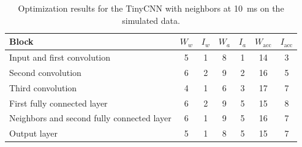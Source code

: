 \begin{table}[H]
    \centering
    \caption{Optimization results for the TinyCNN with neighbors at \SI{10}{\milli\second} on the simulated data.}
    \label{tab:widths}
    \begin{tabular}{@{}lcccccc@{}}
        \toprule
        Block & $W_w$ & $I_w$ & $W_a$ & $I_a$ & $W_{\mathrm{acc}}$ & $I_{\mathrm{acc}}$ \\
        \midrule
        Input and first convolution & 5 & 1 & 8 & 1 & 14 & 3 \\
        Second convolution & 6 & 2 & 9 & 2 & 16 & 5 \\
        Third convolution & 4 & 1 & 6 & 3 & 17 & 7 \\
        First fully connected layer & 6 & 2 & 9 & 5 & 15 & 8 \\
        Neighbors and second fully connected layer & 6 & 1 & 9 & 5 & 16 & 7 \\
        Output layer & 5 & 1 & 8 & 5 & 15 & 7 \\
        \bottomrule
    \end{tabular}
\end{table}